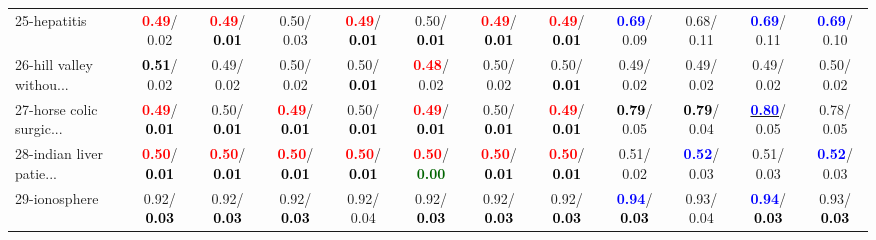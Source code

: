 \begin{table}[h]
\begin{center}
{\begin{tabular}{lc|c|c|c|c|c|c|c|c|c|c}
25-hepatitis & \textcolor{red}{\textbf{  0.49}}/  0.02 & \textcolor{red}{\textbf{  0.49}}/\textcolor{black}{\textbf{  0.01}} &   0.50/  0.03 & \textcolor{red}{\textbf{  0.49}}/\textcolor{black}{\textbf{  0.01}} &   0.50/\textcolor{black}{\textbf{  0.01}} & \textcolor{red}{\textbf{  0.49}}/\textcolor{black}{\textbf{  0.01}} & \textcolor{red}{\textbf{  0.49}}/\textcolor{black}{\textbf{  0.01}} & \textcolor{blue}{\textbf{  0.69}}/  0.09 &   0.68/  0.11 & \textcolor{blue}{\textbf{  0.69}}/  0.11 & \textcolor{blue}{\textbf{  0.69}}/  0.10 \\
26-hill valley withou... & \textcolor{black}{\textbf{  0.51}}/  0.02 &   0.49/  0.02 &   0.50/  0.02 &   0.50/\textcolor{black}{\textbf{  0.01}} & \textcolor{red}{\textbf{  0.48}}/  0.02 &   0.50/  0.02 &   0.50/\textcolor{black}{\textbf{  0.01}} &   0.49/  0.02 &   0.49/  0.02 &   0.49/  0.02 &   0.50/  0.02 \\
27-horse colic surgic... & \textcolor{red}{\textbf{  0.49}}/\textcolor{black}{\textbf{  0.01}} &   0.50/\textcolor{black}{\textbf{  0.01}} & \textcolor{red}{\textbf{  0.49}}/\textcolor{black}{\textbf{  0.01}} &   0.50/\textcolor{black}{\textbf{  0.01}} & \textcolor{red}{\textbf{  0.49}}/\textcolor{black}{\textbf{  0.01}} &   0.50/\textcolor{black}{\textbf{  0.01}} & \textcolor{red}{\textbf{  0.49}}/\textcolor{black}{\textbf{  0.01}} & \textcolor{black}{\textbf{  0.79}}/  0.05 & \textcolor{black}{\textbf{  0.79}}/  0.04 & \underline{\textcolor{blue}{\textbf{  0.80}}}/  0.05 &   0.78/  0.05 \\
28-indian liver patie... & \textcolor{red}{\textbf{  0.50}}/\textcolor{black}{\textbf{  0.01}} & \textcolor{red}{\textbf{  0.50}}/\textcolor{black}{\textbf{  0.01}} & \textcolor{red}{\textbf{  0.50}}/\textcolor{black}{\textbf{  0.01}} & \textcolor{red}{\textbf{  0.50}}/\textcolor{black}{\textbf{  0.01}} & \textcolor{red}{\textbf{  0.50}}/\textcolor{darkgreen}{\textbf{  0.00}} & \textcolor{red}{\textbf{  0.50}}/\textcolor{black}{\textbf{  0.01}} & \textcolor{red}{\textbf{  0.50}}/\textcolor{black}{\textbf{  0.01}} &   0.51/  0.02 & \textcolor{blue}{\textbf{  0.52}}/  0.03 &   0.51/  0.03 & \textcolor{blue}{\textbf{  0.52}}/  0.03 \\ \hline
29-ionosphere &   0.92/\textcolor{black}{\textbf{  0.03}} &   0.92/\textcolor{black}{\textbf{  0.03}} &   0.92/\textcolor{black}{\textbf{  0.03}} &   0.92/  0.04 &   0.92/\textcolor{black}{\textbf{  0.03}} &   0.92/\textcolor{black}{\textbf{  0.03}} &   0.92/\textcolor{black}{\textbf{  0.03}} & \textcolor{blue}{\textbf{  0.94}}/\textcolor{black}{\textbf{  0.03}} &   0.93/  0.04 & \textcolor{blue}{\textbf{  0.94}}/\textcolor{black}{\textbf{  0.03}} &   0.93/\textcolor{black}{\textbf{  0.03}} \\

\end{tabular}}
\end{center}
\end{table}
